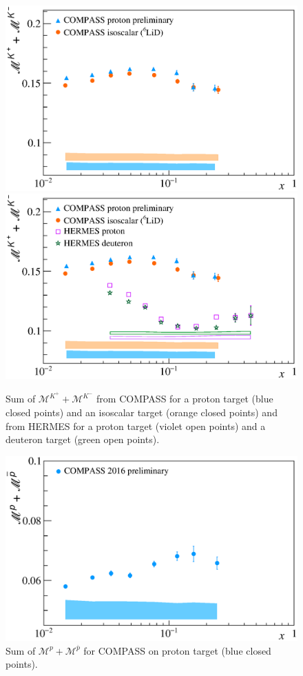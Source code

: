 \begin{figure}[!h]
  \centering
	\includegraphics[scale=0.5]{./gfx/Mult_k_sum_noH.eps}
  \includegraphics[scale=0.5]{./gfx/Mult_k_sum.eps}
  \caption{Sum of $\mathscr{M}^{K^+}+\mathscr{M}^{K^-}$ from COMPASS for a proton target (blue closed points) and an isoscalar target (orange closed points) and from HERMES for a proton target (violet open points) and a deuteron target (green open points).}
  \label{pic:ksum}
\end{figure}

\begin{figure}[!h]
  \centering
	\includegraphics[scale=0.5]{./gfx/Mult_p_sum.eps}
	\caption{Sum of $\mathscr{M}^{p}+\mathscr{M}^{\overline{p}}$ for COMPASS on proton target (blue closed points).}
	\label{pic:psum}
\end{figure}

